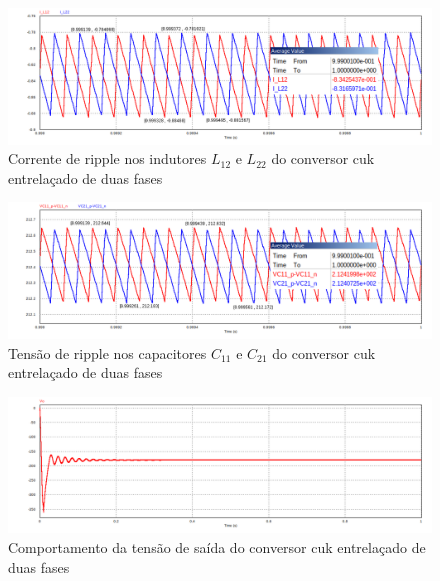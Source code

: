 \documentclass[
	12pt,				%
	openany,
	onseside,
	a4paper,			%
	english,			%
	french,				%
	spanish,			%
	brazil,				%
	]{abntex2}
\begin{document}
\vspace{-10pt}
\begin{figure}[H]%
	\captionsetup{justification=centering}
	\centering
		\includegraphics[width= \linewidth]{cuk_inter_ripp_I_LX2}
		\caption{Corrente de ripple nos indutores $L_{12}$ e $L_{22}$ do conversor cuk entrelaçado de duas fases}
		\label{fig:cuk_inter_ripp_I_L2}
\end{figure}

\begin{figure}[H]%
	\captionsetup{justification=centering}
	\centering
		\includegraphics[width= \linewidth]{cuk_inter_ripp_V_CX1}
		\caption{Tensão de ripple nos capacitores $C_{11}$ e $C_{21}$ do conversor cuk entrelaçado de duas fases}
		\label{fig:cuk_inter_ripp_V_C1}
\end{figure}

\begin{figure}[H]%
	\captionsetup{justification=centering}
	\centering
		\includegraphics[width= \linewidth]{cuk_inter_V_out}
		\caption{Comportamento da tensão de saída do conversor cuk entrelaçado de duas fases}
		\label{fig:cuk_inter_ripp_V_out}
\end{figure}
\end{document}
